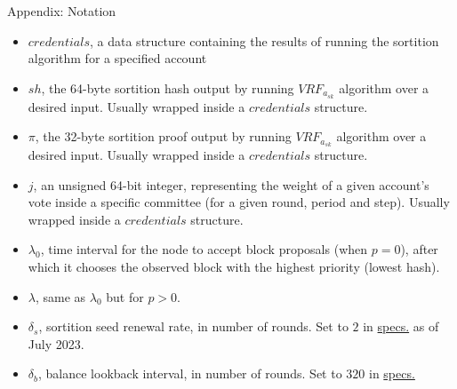 \documentclass[10pt,a4paper]{article}
\begin{document}
\begin{section}{Appendix: Notation}


\begin{itemize}
    \item $credentials$, a data structure containing the results of running the sortition algorithm 
    for a specified account
    \item $sh$, the 64-byte sortition hash output by running $VRF_{a_{sk}}$ algorithm over a desired input.
    Usually wrapped inside a $credentials$ structure.
    \item $\pi$, the 32-byte sortition proof output by running $VRF_{a_{sk}}$ algorithm over a desired input.
    Usually wrapped inside a $credentials$ structure.
    \item $j$, an unsigned 64-bit integer, representing the weight of a given account's vote inside a specific committee
    (for a given round, period and step).
    Usually wrapped inside a $credentials$ structure.
    \item $\lambda_0$, time interval for the node to accept block proposals (when $p=0$), after which it 
    chooses the observed block with the highest priority (lowest hash).
    \item $\lambda$, same as $\lambda_0$ but for $p > 0$.
    \item $\delta_s$, sortition seed renewal rate, in number of rounds. Set to $2$ in 
    \href{https://github.com/algorandfoundation/specs}{specs.} as of July 2023.
    \item $\delta_b$, balance lookback interval, in number of rounds. Set to $320$ in 
    \href{https://github.com/algorandfoundation/specs}{specs.}

\end{itemize}

\end{section}





\printindex
\end{document}
